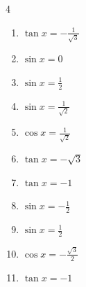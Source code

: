 \begin{multicols}{4}
\begin{enumerate}
  \item $\displaystyle \tan{x}  = -\frac{1}{\sqrt{3}}$


  \item $\displaystyle \sin{x}  = 0$

        \phantom{$\displaystyle x = 0 , \pi$}

  \item $\displaystyle \sin{x}  = \frac{1}{2}$


  \item $\displaystyle \sin{x}  = \frac{1}{\sqrt{2}}$


  \item $\displaystyle \cos{x}  = \frac{1}{\sqrt{2}}$


  \item $\displaystyle \tan{x}  = -\sqrt{3}$


  \item $\displaystyle \tan{x}  = -1$


\columnbreak %

  \item $\displaystyle \sin{x}  = -\frac{1}{2}$


  \item $\displaystyle \sin{x}  = \frac{1}{2}$


  \item $\displaystyle \cos{x}  = -\frac{\sqrt{3}}{2}$


  \item $\displaystyle \tan{x}  = -1$



\end{enumerate}
\end{multicols}
